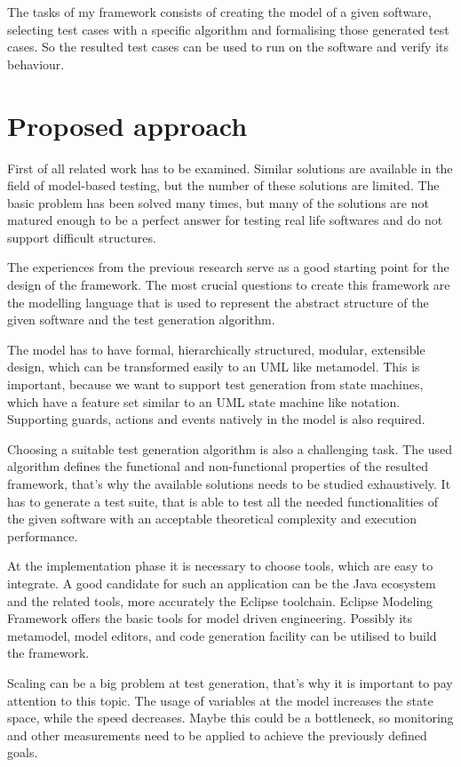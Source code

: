 The tasks of my framework consists of creating the model of a given software, selecting test cases with a specific algorithm and formalising those generated test cases. So the resulted test cases can be used to run on the software and verify its behaviour.


\section*{Proposed approach}
\label{sec:proposedapproach}

First of all related work has to be examined. Similar solutions are available in the field of model-based testing, but the number of these solutions are limited. The basic problem has been solved many times, but many of the solutions are not matured enough to be a perfect answer for testing real life softwares and do not support difficult structures.

The experiences from the previous research serve as a good starting point for the design of the framework. The most crucial questions to create this framework are the modelling language that is used to represent the abstract structure of the given software and the test generation algorithm. 

The model has to have formal, hierarchically structured, modular, extensible design, which can be transformed easily to an UML like metamodel. This is important, because we want to support test generation from state machines, which have a feature set similar to an UML state machine like notation. Supporting guards, actions and events natively in the model is also required.

Choosing a suitable test generation algorithm is also a challenging task. The used algorithm defines the functional and non-functional properties of the resulted framework, that's why the available solutions needs to be studied exhaustively. It has to generate a test suite, that is able to test all the needed functionalities of the given software with an acceptable theoretical complexity and execution performance.

At the implementation phase it is necessary to choose tools, which are easy to integrate. A good candidate for such an application can be the Java ecosystem and the related tools, more accurately the Eclipse toolchain. Eclipse Modeling Framework offers the basic tools for model driven engineering. Possibly its metamodel, model editors, and code generation facility can be utilised to build the framework.

Scaling can be a big problem at test generation, that's why it is important to pay attention to this topic. The usage of variables at the model increases the state space, while the speed decreases. Maybe this could be a bottleneck, so monitoring and other measurements need to be applied to achieve the previously defined goals.


